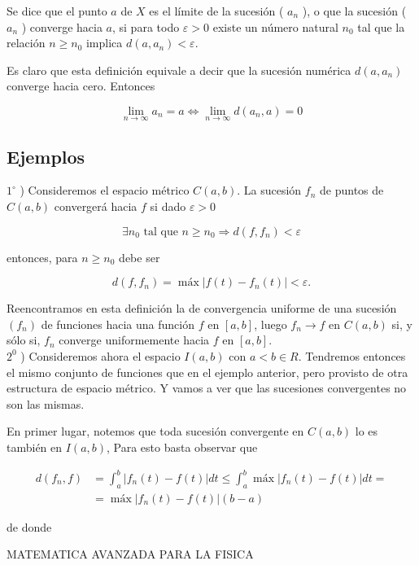 \documentclass[10pt]{article}
\theoremstyle{plain}
\theoremstyle{definition}
\theoremstyle{remark}
\begin{document}
Se dice que el punto $a$ de $X$ es el límite de la sucesión ( $a_{n}$ ), o que la sucesión ( $a_{n}$ ) converge hacia $a$, si para todo $\varepsilon>0$ existe un número natural $n_{0}$ tal que la relación $n \geqslant n_{0}$ implica $d\left(a, a_{n}\right)<\varepsilon$.

Es claro que esta definición equivale a decir que la sucesión numérica $d\left(a, a_{n}\right)$ converge hacia cero. Entonces

$$
\lim _{n \rightarrow \infty} a_{n}=a \Longleftrightarrow \lim _{n \rightarrow \infty} d\left(a_{n}, a\right)=0
$$

\subsection{Ejemplos}
$1^{\circ}$ ) Consideremos el espacio métrico $C(a, b)$. La sucesión $f_{n}$ de puntos de $C(a, b)$ convergerá hacia $f$ si dado $\varepsilon>0$

$$
\exists n_{0} \text { tal que } n \geqslant n_{0} \Rightarrow d\left(f, f_{n}\right)<\varepsilon
$$

entonces, para $n \geqslant n_{0}$ debe ser

$$
d\left(f, f_{n}\right)=\operatorname{máx}\left|f(t)-f_{n}(t)\right|<\varepsilon .
$$

Reencontramos en esta definición la de convergencia uniforme de una sucesión $\left(f_{n}\right)$ de funciones hacia una función $f$ en $[a, b]$, luego $f_{n} \rightarrow f$ en $C(a, b)$ si, y sólo si, $f_{n}$ converge uniformemente hacia $f$ en $[a, b]$.\\
$2^{0}$ ) Consideremos ahora el espacio $I(a, b)$ con $a<b \in R$. Tendremos entonces el mismo conjunto de funciones que en el ejemplo anterior, pero provisto de otra estructura de espacio métrico. Y vamos a ver que las sucesiones convergentes no son las mismas.

En primer lugar, notemos que toda sucesión convergente en $C(a, b)$ lo es también en $I(a, b)$, Para esto basta observar que

$$
\begin{aligned}
d\left(f_{n}, f\right) & =\int_{a}^{b}\left|f_{n}(t)-f(t)\right| d t \leqslant \int_{a}^{b} \operatorname{máx}\left|f_{n}(t)-f(t)\right| d t= \\
& =\operatorname{máx}\left|f_{n}(t)-f(t)\right|(b-a)
\end{aligned}
$$

de donde

MATEMATICA AVANZADA PARA LA FISICA
\end{document}
